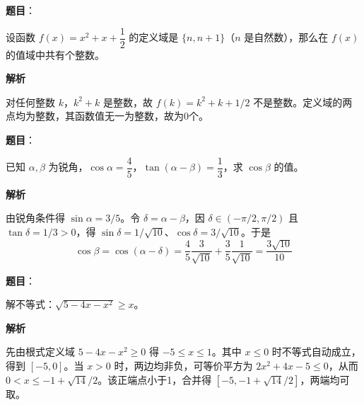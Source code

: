 \begin{answer}

\textbf{题目}：

设函数 $f(x)=x^2+x+\dfrac12$ 的定义域是 $\{n,n+1\}$（$n$ 是自然数），那么在 $f(x)$ 的值域中共有\underline{\hspace{4em}}个整数。

\textbf{解析}

对任何整数 $k$，$k^2+k$ 是整数，故 $f(k)=k^2+k+1/2$ 不是整数。定义域的两点均为整数，其函数值无一为整数，故为0个。


\end{answer}
\begin{answer}

\textbf{题目}：

已知 $\alpha,\beta$ 为锐角，$\cos\alpha=\dfrac45$，$\tan(\alpha-\beta)=\dfrac13$，求 $\cos\beta$ 的值。

\textbf{解析}

由锐角条件得 $\sin\alpha=3/5$。令 $\delta=\alpha-\beta$，因 $\delta\in(-\pi/2,\pi/2)$ 且 $\tan\delta=1/3>0$，得 $\sin\delta=1/\sqrt{10}$、$\cos\delta=3/\sqrt{10}$。于是
\nopagebreak[4]
\[
\cos\beta=\cos(\alpha-\delta)
=\frac45\frac3{\sqrt{10}}+\frac35\frac1{\sqrt{10}}
=\frac{3\sqrt{10}}{10}
\]


\end{answer}
\begin{answer}

\textbf{题目}：

解不等式：$\sqrt{5-4x-x^2}\ge x$。

\textbf{解析}

先由根式定义域 $5-4x-x^2\ge0$ 得 $-5\le x\le1$。其中 $x\le0$ 时不等式自动成立，得到 $[-5,0]$。当 $x>0$ 时，两边均非负，可等价平方为 $2x^2+4x-5\le0$，从而 $0<x\le-1+\sqrt{14}/2$。该正端点小于1，合并得 $[-5,-1+\sqrt{14}/2]$，两端均可取。


\end{answer}
